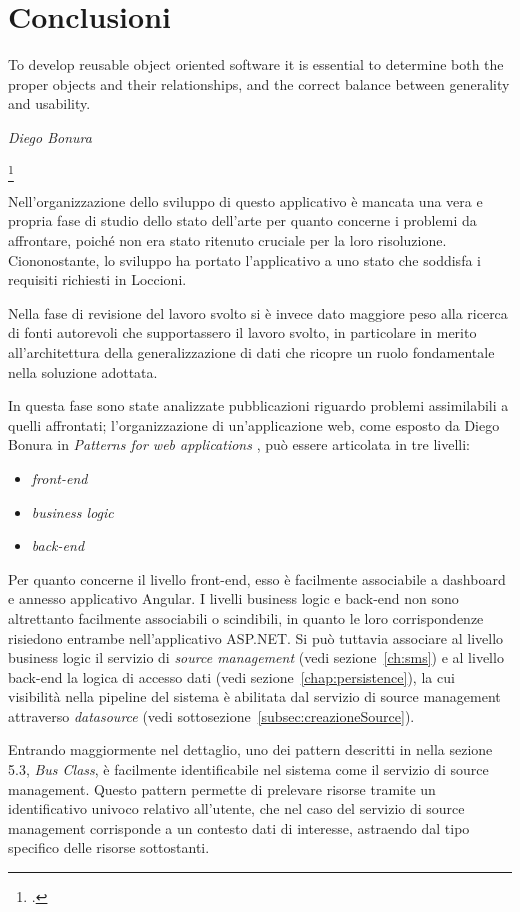 \chapter{Conclusioni}
\setlength{\epigraphwidth}{0.6\textwidth}
\epigraph{To develop reusable object oriented software it is essential to
determine both the proper objects and their relationships,
and the correct balance between generality and usability.}{\textit{Diego Bonura}\footnotemark }
\footcitetext{DBLP:conf/seke/BonuraCM02}

Nell'organizzazione dello sviluppo di questo applicativo è mancata una vera e propria fase di studio dello stato dell'arte per quanto concerne i problemi da affrontare, poiché non era stato ritenuto cruciale per la loro risoluzione.
Ciononostante, lo sviluppo ha portato l'applicativo a uno stato che soddisfa i requisiti richiesti in Loccioni. 

Nella fase di revisione del lavoro svolto si è invece dato maggiore peso alla ricerca di fonti autorevoli che supportassero il lavoro svolto, in particolare in merito all'architettura della generalizzazione di dati che ricopre un ruolo fondamentale nella soluzione adottata.

In questa fase sono state analizzate pubblicazioni riguardo problemi assimilabili a quelli affrontati; l'organizzazione di un'applicazione web, come esposto da Diego Bonura in \textit{Patterns for web applications} \cite{DBLP:conf/seke/BonuraCM02}, può essere articolata in tre livelli:
\begin{itemize}
\item
\textit{front-end}
\item
\textit{business logic}
\item
\textit{back-end}
\end{itemize}

Per quanto concerne il livello front-end, esso è facilmente associabile a dashboard e annesso applicativo Angular.
I livelli business logic e back-end non sono altrettanto facilmente associabili o scindibili, in quanto le loro corrispondenze risiedono entrambe nell'applicativo ASP.NET. Si può tuttavia associare al livello business logic il servizio di \textit{source management} (vedi sezione~\ref{ch:sms}) e al livello back-end la logica di accesso dati (vedi sezione~\ref{chap:persistence}), la cui visibilità nella pipeline del sistema è abilitata dal servizio di source management attraverso \textit{datasource} (vedi sottosezione~\ref{subsec:creazioneSource}).

Entrando maggiormente nel dettaglio, uno dei pattern descritti in \cite{DBLP:conf/seke/BonuraCM02} nella sezione 5.3, \textit{Bus Class}, è facilmente identificabile nel sistema come il servizio di source management. Questo pattern permette di prelevare risorse tramite un identificativo univoco relativo all'utente, che nel caso del servizio di source management corrisponde a un contesto dati di interesse, astraendo dal tipo specifico delle risorse sottostanti.

